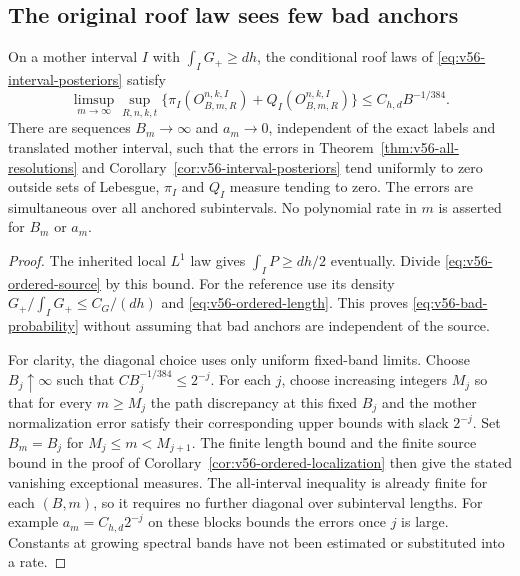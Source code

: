 \subsection{The original roof law sees few bad anchors}
\begin{corollary}
\label{cor:v56-anchor-probability}
On a mother interval $I$ with $\int_I G_+\ge dh$, the conditional
roof laws of \eqref{eq:v56-interval-posteriors} satisfy
\begin{equation}\label{eq:v56-bad-probability}
 \limsup_{m\to\infty}\sup_{R,n,k,t}
 \{\pi_I(O_{B,m,R}^{n,k,I})+Q_I(O_{B,m,R}^{n,k,I})\}
                                 \le C_{h,d}B^{-1/384}.
\end{equation}
There are sequences $B_m\to\infty$ and $a_m\to0$, independent of
the exact labels and translated mother interval, such that the
errors in Theorem~\ref{thm:v56-all-resolutions} and
Corollary~\ref{cor:v56-interval-posteriors} tend uniformly to zero
outside sets of Lebesgue, $\pi_I$ and $Q_I$ measure tending to zero.
The errors are simultaneous over all anchored subintervals. No
polynomial rate in $m$ is asserted for $B_m$ or $a_m$.
\end{corollary}
\begin{proof}
The inherited local $L^1$ law gives $\int_I P\ge dh/2$ eventually.
Divide \eqref{eq:v56-ordered-source} by this bound. For the reference
use its density $G_+/\int_I G_+\le C_G/(dh)$ and
\eqref{eq:v56-ordered-length}. This proves
\eqref{eq:v56-bad-probability} without assuming that bad anchors
are independent of the source.

For clarity, the diagonal choice uses only uniform fixed-band limits.
Choose $B_j\uparrow\infty$ such that $CB_j^{-1/384}\le2^{-j}$.
For each $j$, choose increasing integers $M_j$ so that for every
$m\ge M_j$ the path discrepancy at this fixed $B_j$ and the mother
normalization error satisfy their corresponding upper bounds with
slack $2^{-j}$. Set $B_m=B_j$ for $M_j\le m<M_{j+1}$.
The finite length bound and the finite source bound in the proof of
Corollary~\ref{cor:v56-ordered-localization} then give the stated
vanishing exceptional measures. The all-interval inequality is
already finite for each $(B,m)$, so it requires no further diagonal
over subinterval lengths. For example $a_m=C_{h,d}2^{-j}$ on these
blocks bounds the errors once $j$ is large. Constants at growing
spectral bands have not been estimated or substituted into a rate.
\end{proof}

